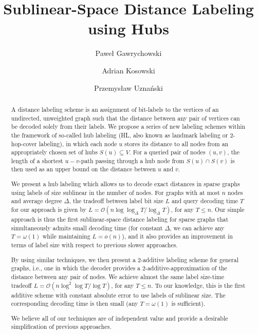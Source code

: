 \documentclass{article}[11pt,letter]
\newcommand{\bigo}{\mathcal{O}}
\begin{document}
\author[1]{Pawe\l{} Gawrychowski}
\author[2]{Adrian Kosowski}
\author[3]{Przemys\l{}aw Uznański}


\date{}

\title{Sublinear-Space Distance Labeling using Hubs}

\maketitle

\begin{abstract}
A distance labeling scheme is an assignment of bit-labels to the vertices of an undirected, unweighted graph such that the distance between any pair of vertices can be decoded solely from their labels. We propose a series of new labeling schemes within the framework of so-called hub labeling (HL, also known as landmark labeling or 2-hop-cover labeling), in which each node $u$ stores its distance to all nodes from an appropriately chosen set of hubs $S(u) \subseteq V$. For a queried pair of nodes $(u,v)$, the length of a shortest $u\!-\!v$-path passing through a hub node from $S(u)\cap S(v)$ is then used as an upper bound on the distance between $u$ and $v$.

We present a hub labeling which allows us to decode exact distances in sparse graphs using labels of size sublinear in the number of nodes.  For graphs with at most $n$ nodes and average degree $\Delta$, the tradeoff between label bit size $L$ and query decoding time $T$ for our approach is given by $L = \bigo(n \log \log_\Delta T / \log_\Delta T)$, for any $T \leq n$. Our simple approach is thus the first sublinear-space distance labeling for sparse graphs that simultaneously admits small decoding time (for constant $\Delta$, we can achieve any $T=\omega(1)$ while maintaining $L=o(n)$), and it also provides an improvement in terms of label size with respect to previous slower approaches.

By using similar techniques, we then present a $2$-additive labeling scheme for general graphs, i.e., one in which the decoder provides a 2-additive-approximation of the distance between any pair of nodes. We achieve almost the same label size-time tradeoff $L = \bigo(n \log^2 \log T / \log T)$, for any $T \leq n$. To our knowledge, this is the first additive scheme with constant absolute error to use labels of sublinear size. The corresponding decoding time is then small (any $T=\omega(1)$ is sufficient).

We believe all of our techniques are of independent value and provide a desirable simplification of previous approaches.
\end{abstract}
\end{document}
